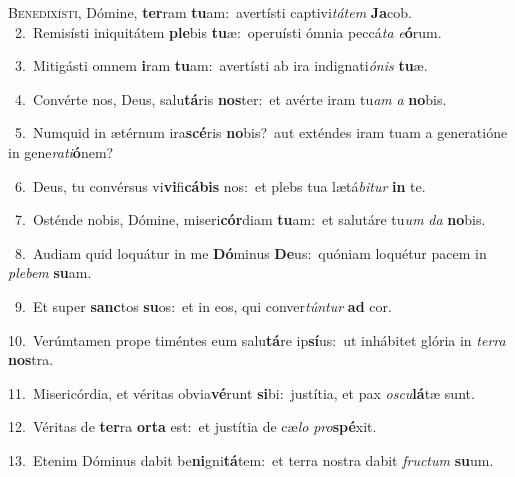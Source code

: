 \lettrine{\initial\textcolor{\initialcolor}{B}}{enedixísti,} Dómine, \textbf{ter}\-ram \textbf{tu}\-am:~\star avertísti captivi\-\textit{tá}\-\textit{tem} \textbf{Ja}\-cob.\\
{\numbfont\textcolor{\numbcolor}{~2.}}~Remisísti iniquitátem \textbf{ple}\-bis \textbf{tu}\-æ:~\star operuísti ómnia peccá\textit{ta} \textit{e}\-\textbf{ó}rum.\par
{\numbfont\textcolor{\numbcolor}{~3.}}~Mitigásti omnem \textbf{i}\-ram \textbf{tu}\-am:~\star avertísti ab ira indignati\-\textit{ó}\-\textit{nis} \textbf{tu}\-æ.\par
{\numbfont\textcolor{\numbcolor}{~4.}}~Convérte nos, Deus, salu\-\textbf{tá}\-ris \textbf{nos}\-ter:~\star et avérte iram tu\textit{am} \textit{a} \textbf{no}\-bis.\par
{\numbfont\textcolor{\numbcolor}{~5.}}~Numquid in ætérnum ira\-\textbf{scé}\-ris \textbf{no}\-bis?~\star aut exténdes iram tuam a generatióne in gene\-\textit{ra}\-\textit{ti}\textbf{ó}nem?\par
{\numbfont\textcolor{\numbcolor}{~6.}}~Deus, tu convérsus vi\-\textbf{vi}\-fi\-\textbf{cá}\-\textbf{bis} nos:~\star et plebs tua lætá\-\textit{bi}\-\textit{tur} \textbf{in} te.\par
{\numbfont\textcolor{\numbcolor}{~7.}}~Osténde nobis, Dómine, miseri\-\textbf{cór}\-diam \textbf{tu}\-am:~\star et salutáre tu\textit{um} \textit{da} \textbf{no}\-bis.\par
{\numbfont\textcolor{\numbcolor}{~8.}}~Audiam quid loquátur in me \textbf{Dó}\-minus \textbf{De}\-us:~\star quóniam loquétur pacem in \textit{ple}\-\textit{bem} \textbf{su}\-am.\par
{\numbfont\textcolor{\numbcolor}{~9.}}~Et super \textbf{sanc}\-tos \textbf{su}\-os:~\star et in eos, qui conver\-\textit{tún}\-\textit{tur} \textbf{ad} cor.\par
{\numbfont\textcolor{\numbcolor}{10.}}~Verúmtamen prope timéntes eum salu\-\textbf{tá}\-re ip\-\textbf{sí}\-us:~\star ut inhábitet glória in \textit{ter}\-\textit{ra} \textbf{nos}\-tra.\par
{\numbfont\textcolor{\numbcolor}{11.}}~Misericórdia, et véritas obvia\-\textbf{vé}\-runt \textbf{si}\-bi:~\star justítia, et pax \textit{os}\-\textit{cu}\textbf{lá}tæ sunt.\par
{\numbfont\textcolor{\numbcolor}{12.}}~Véritas de \textbf{ter}\-ra \textbf{or}\-\textbf{ta} est:~\star et justítia de cæ\textit{lo} \textit{pro}\-\textbf{spé}xit.\par
{\numbfont\textcolor{\numbcolor}{13.}}~Etenim Dóminus dabit be\-\textbf{ni}\-gni\-\textbf{tá}\-tem:~\star et terra nostra dabit \textit{fruc}\-\textit{tum} \textbf{su}\-um.\par
